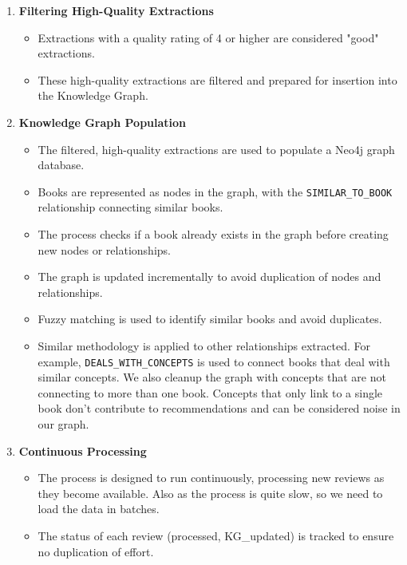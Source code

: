 \documentclass{article}
\begin{document}
\begin{enumerate}
      \item \textbf{Filtering High-Quality Extractions}
            \begin{itemize}
                  \item Extractions with a quality rating of 4 or higher are
                        considered
                        "good" extractions.
                  \item These high-quality extractions are filtered and
                        prepared for
                        insertion into the Knowledge Graph.
            \end{itemize}

      \item \textbf{Knowledge Graph Population}
            \begin{itemize}
                  \item The filtered, high-quality extractions are used to
                        populate a
                        Neo4j graph database.
                  \item Books are represented as nodes in the graph, with the
                        \texttt{SIMILAR\_TO\_BOOK} relationship connecting
                        similar books.
                  \item The process checks if a book already exists in the
                        graph before
                        creating new nodes or relationships.
                  \item The graph is updated incrementally to avoid duplication
                        of
                        nodes and relationships.
                  \item Fuzzy matching is used to identify similar books and
                        avoid
                        duplicates.
                  \item Similar methodology is applied to other relationships
                        extracted. For example, \texttt{DEALS\_WITH\_CONCEPTS} is
                        used to connect books that deal with similar concepts. We also cleanup the graph with concepts that are not connecting to more than one book.
                        Concepts that only link to a single book don't contribute to recommendations and can be considered noise in our graph.
            \end{itemize}

      \item \textbf{Continuous Processing}
            \begin{itemize}
                  \item The process is designed to run continuously, processing
                        new
                        reviews as they become available. Also as the process is quite slow, so we need to load the data in batches.
                  \item The status of each review (processed, KG\_updated) is
                        tracked
                        to ensure no duplication of effort.


\end{itemize}
\end{enumerate}
\end{document}
